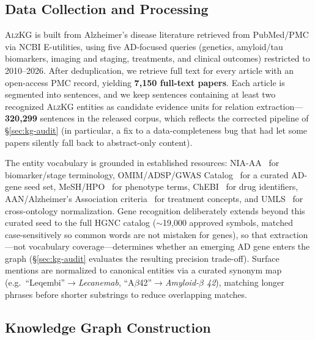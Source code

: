 \documentclass{article}
\begin{document}
\subsection{Data Collection and Processing}

\textsc{AlzKG} is built from Alzheimer's disease literature retrieved from PubMed/PMC via NCBI E-utilities, using five AD-focused queries (genetics, amyloid/tau biomarkers, imaging and staging, treatments, and clinical outcomes) restricted to 2010--2026. After deduplication, we retrieve full text for every article with an open-access PMC record, yielding \textbf{7{,}150 full-text papers}. Each article is segmented into sentences, and we keep sentences containing at least two recognized \textsc{AlzKG} entities as candidate evidence units for relation extraction---\textbf{320{,}299} sentences in the released corpus, which reflects the corrected pipeline of \S\ref{sec:kg-audit} (in particular, a fix to a data-completeness bug that had let some papers silently fall back to abstract-only content).

The entity vocabulary is grounded in established resources: NIA-AA~\citep{jack2018nia} for biomarker/stage terminology, OMIM/ADSP/GWAS Catalog~\citep{bellenguez2022gwas,lambert2013igap} for a curated AD-gene seed set, MeSH/HPO~\citep{kohler2021hpo} for phenotype terms, ChEBI~\citep{hastings2016chebi} for drug identifiers, AAN/Alzheimer's Association criteria~\citep{cummings2023auc} for treatment concepts, and UMLS~\citep{bodenreider2004umls} for cross-ontology normalization. Gene recognition deliberately extends beyond this curated seed to the full HGNC catalog ($\sim$19{,}000 approved symbols, matched case-sensitively so common words are not mistaken for genes), so that extraction---not vocabulary coverage---determines whether an emerging AD gene enters the graph (\S\ref{sec:kg-audit} evaluates the resulting precision trade-off). Surface mentions are normalized to canonical entities via a curated synonym map (e.g.\ ``Leqembi''$\rightarrow$\emph{Lecanemab}, ``A$\beta$42''$\rightarrow$\emph{Amyloid-$\beta$ 42}), matching longer phrases before shorter substrings to reduce overlapping matches.

\subsection{Knowledge Graph Construction}
\label{sec:kg-construction}
\end{document}
